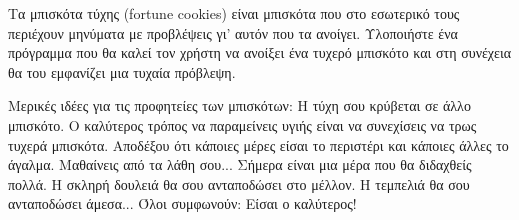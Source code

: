 \documentclass[a4paper,11pt,oneside]{book}
\begin{document}
\begin{exercise}
Τα μπισκότα τύχης (fortune cookies) είναι μπισκότα που στο εσωτερικό τους περιέχουν μηνύματα με προβλέψεις γι' αυτόν που τα ανοίγει. Υλοποιήστε ένα πρόγραμμα που θα καλεί τον χρήστη να ανοίξει ένα τυχερό μπισκότο και στη συνέχεια θα του εμφανίζει μια τυχαία πρόβλεψη. 

\begin{note}
Μερικές ιδέες για τις προφητείες των μπισκότων: Η τύχη σου κρύβεται σε άλλο μπισκότο. Ο καλύτερος τρόπος να παραμείνεις υγιής είναι να συνεχίσεις να τρως τυχερά μπισκότα. Αποδέξου ότι κάποιες μέρες είσαι το περιστέρι και κάποιες άλλες το άγαλμα. Μαθαίνεις από τα λάθη σου... Σήμερα είναι μια μέρα που θα διδαχθείς πολλά. Η σκληρή δουλειά θα σου ανταποδώσει στο μέλλον. Η τεμπελιά θα σου ανταποδώσει άμεσα... Όλοι συμφωνούν: Είσαι ο καλύτερος!
\end{note}
\end{exercise}
\end{document}
